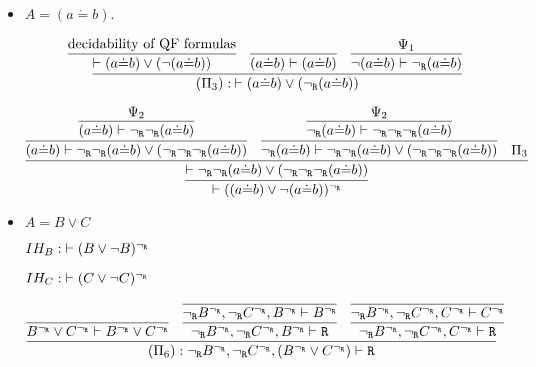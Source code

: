 \begin{enumerate}[(i)]
\begin{itemize}
        \item $A = (a \dot{=} b)$.

            $$
            \infer{
                (\Pi_3) :\:\vdash (a \dot{=} b) \vee (\neg_\R(a \dot{=} b))
            }{
                \infer{
                    \vdash (a \dot{=} b) \vee (\neg(a \dot{=} b))
                }{
                    \text{decidability of QF formulas}
                }
                &
                \infer{
                    (a \dot{=} b) \vdash (a \dot{=} b)
                }{
                }
                &
                \infer{
                    \neg(a \dot{=} b) \vdash \neg_\R(a \dot{=} b)
                }{
                    \Psi_1
                }
            }
            $$

            $$
            \infer{
                \vdash ((a \dot{=} b) \vee \neg(a \dot{=} b))^{\neg_\R}
            }{
                \infer{
                    \vdash \neg_\R\neg_\R(a \dot{=} b) \vee (\neg_\R\neg_\R\neg_\R(a \dot{=} b))
                }{
                    \infer{
                        (a \dot{=} b) \vdash \neg_\R\neg_\R(a \dot{=} b) \vee (\neg_\R\neg_\R\neg_\R(a \dot{=} b))
                    }{
                        \infer{
                            (a \dot{=} b) \vdash \neg_\R\neg_\R(a \dot{=} b)
                        }{
                            \Psi_2
                        }
                    }&
                    \infer{
                        \neg_\R(a \dot{=} b) \vdash \neg_\R\neg_\R(a \dot{=} b) \vee (\neg_\R\neg_\R\neg_\R(a \dot{=} b))
                    }{
                        \infer{
                            \neg_\R(a \dot{=} b) \vdash \neg_\R\neg_\R\neg_\R(a \dot{=} b)
                        }{
                            \Psi_2
                        }
                    }&
                    \Pi_3
                }
            }
            $$
        \item $A = B \vee C$
        
            $IH_B : \; \vdash (B \vee \neg B)^{\neg_{\texttt{R}}}$
            
            $IH_C : \; \vdash (C \vee \neg C)^{\neg_{\texttt{R}}}$

            $$
            \infer{
                (\Pi_6) : {\neg_\R} B^{\neg_\R}, {\neg_\R} C^{\neg_\R}, (B^{\neg_\R} \vee C^{\neg_\R}) \vdash \R
            }{
                    \infer{B^{\neg_\R} \vee C^{\neg_\R} \vdash B^{\neg_\R} \vee C^{\neg_\R}
                }{
                }&
                \infer{
                    {\neg_\R} B^{\neg_\R}, {\neg_\R} C^{\neg_\R}, B^{\neg_\R} \vdash \R
                }{
                    \infer{
                        {\neg_\R} B^{\neg_\R}, {\neg_\R} C^{\neg_\R}, B^{\neg_\R} \vdash B^{\neg_\R}
                    }{
                    }
                }&
                \infer{
                    {\neg_\R} B^{\neg_\R}, {\neg_\R} C^{\neg_\R}, C^{\neg_\R} \vdash \R
                }{
                    \infer{
                        {\neg_\R} B^{\neg_\R}, {\neg_\R} C^{\neg_\R}, C^{\neg_\R} \vdash C^{\neg_\R}
                    }{
                    }
                }
            }
            $$
            

\end{itemize}
\end{enumerate}
